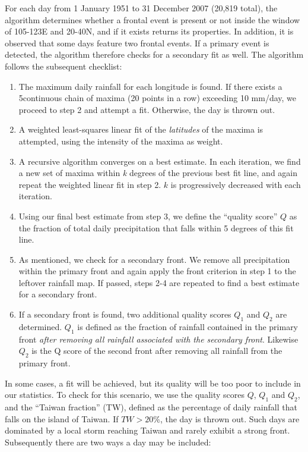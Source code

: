 \documentclass[draft,grl]{AGUTeX}
\begin{document}
\begin{article}
	For each day from 1 January 1951 to 31 December 2007 (20,819 total), the algorithm determines whether a frontal event is present or not inside the window of 105-123E and 20-40N, and if it exists returns its properties. In addition, it is observed that some days feature two frontal events. If a primary event is detected, the algorithm therefore checks for a secondary fit as well. The algorithm follows the subsequent checklist:

\begin{enumerate}
	\item The maximum daily rainfall for each longitude is found. If there exists a 5\textdegree continuous chain of maxima (20 points in a row) exceeding 10 mm/day, we proceed to step 2 and attempt a fit. Otherwise, the day is thrown out.
	
	\item A weighted least-squares linear fit of the \textit{latitudes} of the maxima is attempted, using the intensity of the maxima as weight.
	
	\item A recursive algorithm converges on a best estimate. In each iteration, we find a new set of maxima within \textit{k} degrees of the previous best fit line, and again repeat the weighted linear fit in step 2. $k$ is progressively decreased with each iteration.
	
	\item Using our final best estimate from step 3, we define the ``quality score'' $Q$ as the fraction of total daily precipitation that falls within 5 degrees of this fit line.
	
	\item As mentioned, we check for a secondary front. We remove all precipitation within the primary front and again apply the front criterion in step 1 to the leftover rainfall map. If passed, steps 2-4 are repeated to find a best estimate for a secondary front.
	
	\item If a secondary front is found, two additional quality scores $Q_1$ and $Q_2$ are determined. $Q_1$ is defined as the fraction of rainfall contained in the primary front \textit{after removing all rainfall associated with the secondary front}. Likewise $Q_2$ is the Q score of the second front after removing all rainfall from the primary front.		
	
\end{enumerate} 
	
	
In some cases, a fit will be achieved, but its quality will be too poor to include in our statistics. To check for this scenario, we use the quality scores $Q$, $Q_1$ and $Q_2$, and the ``Taiwan fraction'' (TW), defined as the percentage of daily rainfall that falls on the island of Taiwan. If $TW > 20\%$, the day is thrown out. Such days are dominated by a local storm reaching Taiwan and rarely exhibit a strong front. Subsequently there are two ways a day may be included: 
	

\end{article}
\end{document}
